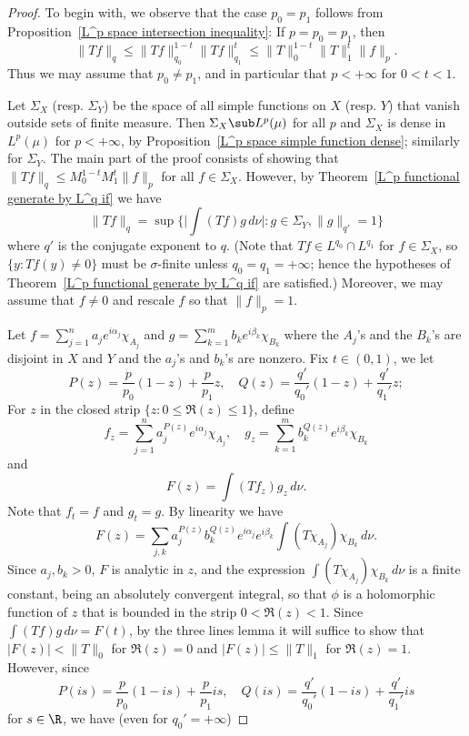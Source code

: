 \begin{proof}
To begin with, we observe that the case $p_0=p_1$ follows from Proposition~\ref{L^p space intersection inequality}: If $p=p_0=p_1$, then
\[\|Tf\|_{q}\leq\|Tf\|_{q_0}^{1-t}\|Tf\|_{q_1}^{t}\leq\|T\|_0^{1-t}\|T\|_{1}^{t}\|f\|_{p}.\]
Thus we may assume that $p_0\neq p_1$, and in particular that $p<+\infty$ for $0<t<1$.\par
Let $\Sigma_X$ (resp. $\Sigma_Y$) be the space of all simple functions on $X$ (resp. $Y$) that vanish outside sets of finite measure. Then $\Sigma_X\sub L^p(\mu)$ for all $p$ and $\Sigma_X$ is dense in $L^p(\mu)$ for $p<+\infty$, by Proposition~\ref{L^p space simple function dense}; similarly for $\Sigma_Y$. The main part of the proof consists of showing that $\|Tf\|_{q}\leq M_0^{1-t}M_1^t\|f\|_{p}$ for all $f\in\Sigma_X$. However, by Theorem~\ref{L^p functional generate by L^q if} we have
\[\|Tf\|_{q}=\sup\{\Big|\int(Tf)g\,d\nu\Big|:g\in\Sigma_Y,\|g\|_{q'}=1\}\]
where $q'$ is the conjugate exponent to $q$. (Note that $Tf\in L^{q_0}\cap L^{q_1}$ for $f\in\Sigma_X$, so $\{y:Tf(y)\neq 0\}$ must be $\sigma$-finite unless $q_0=q_1=+\infty$; hence the hypotheses of Theorem~\ref{L^p functional generate by L^q if} are satisfied.) Moreover, we may assume that $f\neq 0$ and rescale $f$ so that $\|f\|_{p}=1$.\par
Let $f=\sum_{j=1}^{n}a_je^{i\alpha_j}\chi_{A_j}$ and $g=\sum_{k=1}^{m}b_ke^{i\beta_k}\chi_{B_k}$ where the $A_j$'s and the $B_k$'s are disjoint in $X$ and $Y$ and the $a_j$'s and $b_k$'s are nonzero. Fix $t\in(0,1)$, we let
\[P(z)=\frac{p}{p_0}(1-z)+\frac{p}{p_1}z,\quad Q(z)=\frac{q'}{q_0'}(1-z)+\frac{q'}{q_1'}z;\]
For $z$ in the closed strip $\{z:0\leq\Re(z)\leq 1\}$, define
\[f_z=\sum_{j=1}^{n}a_j^{P(z)}e^{i\alpha_j}\chi_{A_j},\quad g_z=\sum_{k=1}^{m}b_k^{Q(z)}e^{i\beta_k}\chi_{B_k}\]
and
\[F(z)=\int(Tf_z)g_z\,d\nu.\]
Note that $f_t=f$ and $g_t=g$. By linearity we have
\[F(z)=\sum_{j,k}a_j^{P(z)}b_k^{Q(z)}e^{i\alpha_j}e^{i\beta_k}\int(T\chi_{A_j})\chi_{B_k}\,d\nu.\]
Since $a_j,b_k>0$, $F$ is analytic in $z$, and the expression $\int(T\chi_{A_j})\chi_{B_k}\,d\nu$ is a finite constant, being an absolutely convergent integral, so that $\phi$ is a holomorphic function of $z$ that is bounded in the strip $0<\Re(z)<1$. Since $\int(Tf)g\,d\nu=F(t)$, by the three lines lemma it will suffice to show that $|F(z)|<\|T\|_0$ for $\Re(z)=0$ and $|F(z)|\leq\|T\|_1$ for $\Re (z)=1$. However, since
\[P(is)=\frac{p}{p_0}(1-is)+\frac{p}{p_1}is,\quad Q(is)=\frac{q'}{q_0'}(1-is)+\frac{q'}{q_1'}is\]
for $s\in\R$, we have (even for $q_0'=+\infty$)

\end{proof}
